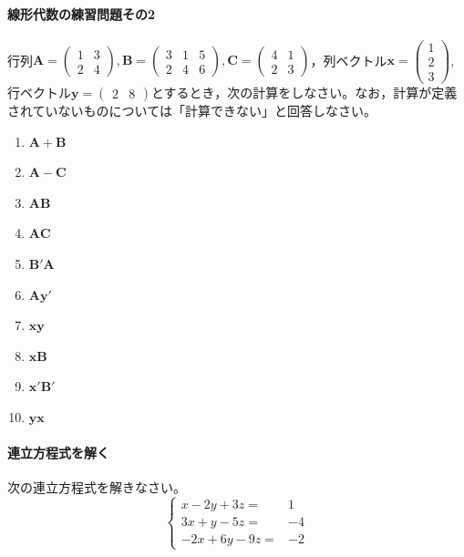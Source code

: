 \documentclass{ltjsbook}
\begin{document}
\paragraph{線形代数の練習問題その2}行列$\bm{A}=\begin{pmatrix}1 & 3 \\2 & 4\end{pmatrix},\bm{B}=\begin{pmatrix}3&1&5\\2&4&6\end{pmatrix},\bm{C}=\begin{pmatrix}4&1\\2&3\end{pmatrix}$，列ベクトル$\bm{x}=\begin{pmatrix}1\\2\\3\end{pmatrix}$,行ベクトル$\bm{y}=\begin{pmatrix}2&8\end{pmatrix}$とするとき，次の計算をしなさい。なお，計算が定義されていないものについては「計算できない」と回答しなさい。
\begin{enumerate}
    \item $\bm{A}+\bm{B}$
    \item $\bm{A}-\bm{C}$
    \item $\bm{AB}$
    \item $\bm{AC}$
    \item $\bm{B}'\bm{A}$
    \item $\bm{A}\bm{y}'$
    \item $\bm{xy}$
    \item $\bm{xB}$
    \item $\bm{x}'\bm{B}'$
    \item $\bm{yx}$
\end{enumerate}

\paragraph{連立方程式を解く}次の連立方程式を解きなさい。
\[
\left\{\begin{array}{rr}x-2 y+3 z= & 1 \\ 3 x+y-5 z= & -4 \\ -2 x+6 y-9 z= & -2\end{array}\right.
\]
\end{document}
